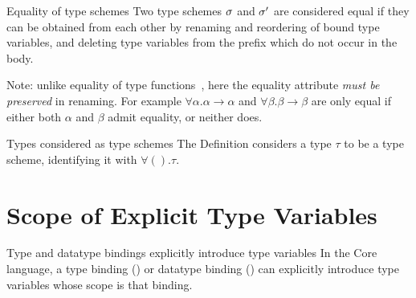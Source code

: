 \begin{clause}{Equality of type schemes}
Two type schemes $\sigma$ and $\sigma'$ are considered equal
if they can be obtained from each other by
renaming and reordering of bound type variables, and deleting type
variables from the prefix which do not occur in the body.

Note: unlike equality of type functions~, here the equality attribute
\emph{must be preserved} in renaming. For example $\forall\alpha.\alpha\to\alpha$
and $\forall\beta.\beta\to\beta$ are only equal if either both $\alpha$
and $\beta$ admit equality, or neither does.
\end{clause}

\begin{clause}{Types considered as type schemes}
The Definition considers a type $\tau$ to be a type scheme, identifying it with
$\forall().\tau$.
\end{clause}

\section{Scope of Explicit Type Variables}\label{sec:static-core:scope-of-explicit-type-variables}

\begin{clause}{Type and datatype bindings explicitly introduce type variables}
In the Core language, a type binding
(\hyperref[grammar:typbind]{}) or datatype binding (\hyperref[grammar:datbind]{}) can explicitly
introduce type variables whose scope is that binding.
\end{clause}

